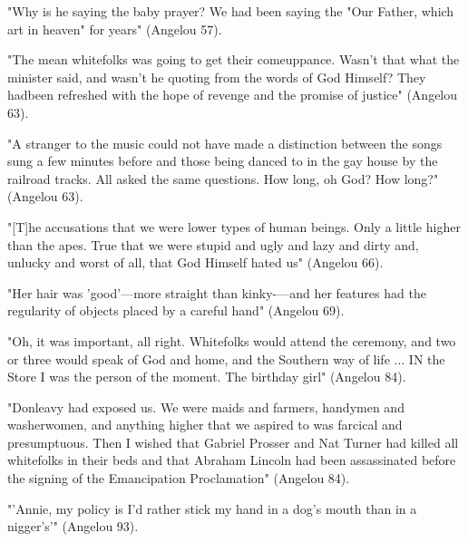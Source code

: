 "Why is he saying the baby prayer? We had been saying the "Our Father, which art in heaven" for years" (Angelou 57).


"The mean whitefolks was going to get their comeuppance. Wasn't that what the minister said, and wasn't he quoting from the words of God Himself? They hadbeen refreshed with the hope of revenge and the promise of justice" (Angelou 63).

"A stranger to the music could not have made a distinction between the songs sung a few minutes before and those being danced to in the gay house by the railroad tracks. All asked the same questions. How long, oh God? How long?" (Angelou 63).

"[T]he accusations that we were lower types of human beings. Only a little higher than the apes. True that we were stupid and ugly and lazy and dirty and, unlucky and worst of all, that God Himself hated us" (Angelou 66).


"Her hair was 'good'—more straight than kinky-—and her
features had the regularity of objects placed by a careful hand" (Angelou 69).

"Oh, it was important, all right. Whitefolks would attend the ceremony, and two or three would speak of God and home, and the Southern way of life ... IN the Store I was the person of the moment. The birthday girl" (Angelou 84).


"Donleavy had exposed us. We were maids and farmers, handymen and washerwomen, and anything higher that we aspired to was farcical and presumptuous. Then I wished that Gabriel Prosser and Nat Turner had killed all whitefolks in their beds and that Abraham Lincoln had been assassinated before the signing of the Emancipation Proclamation" (Angelou 84).


"'Annie, my policy is I'd rather stick my hand in a dog's mouth than in a nigger's'" (Angelou 93).
